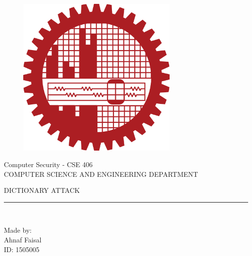 \documentclass[11pt, english]{article}
\begin{document}
\begin{titlepage}

\begin{center}
\vspace*{-1in}
\begin{figure}[htb]
\begin{center}
\includegraphics[width=8cm]{logo}
\end{center}
\end{figure}

Computer Security -  CSE 406\\
\vspace*{0.15in}
COMPUTER SCIENCE AND ENGINEERING DEPARTMENT \\
\vspace*{0.4in}
\begin{large}
DICTIONARY ATTACK\\
\end{large}
\vspace*{0.2in}
\rule{80mm}{0.1mm}\\
\vspace*{0.1in}
\begin{large}
Made by: \\
Ahnaf Faisal \\
ID: 1505005 \\
\end{large}
\end{center}
\end{titlepage}
\end{document}
